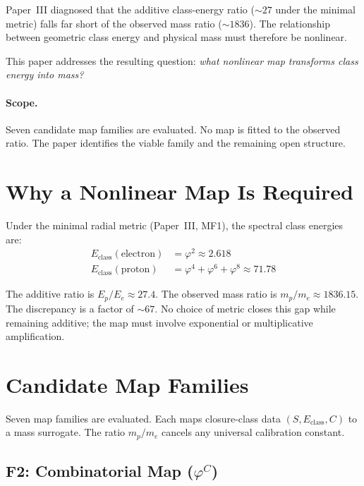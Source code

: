 \documentclass[12pt]{article}
\newcommand{\phig}{\varphi}
\begin{document}
Paper~III diagnosed that the additive class-energy ratio ($\sim\!27$ under the minimal metric) falls far short of the observed mass ratio ($\sim\!1836$). The relationship between geometric class energy and physical mass must therefore be nonlinear.

This paper addresses the resulting question: \textit{what nonlinear map transforms class energy into mass?}

\paragraph{Scope.} Seven candidate map families are evaluated. No map is fitted to the observed ratio. The paper identifies the viable family and the remaining open structure.

\section{Why a Nonlinear Map Is Required}\label{sec:why}

Under the minimal radial metric (Paper~III, MF1), the spectral class energies are:
\begin{align}
    E_{\mathrm{class}}(\text{electron}) &= \phig^2 \approx 2.618 \\
    E_{\mathrm{class}}(\text{proton}) &= \phig^4 + \phig^6 + \phig^8 \approx 71.78
\end{align}

The additive ratio is $E_p / E_e \approx 27.4$. The observed mass ratio is $m_p / m_e \approx 1836.15$. The discrepancy is a factor of $\sim\!67$. No choice of metric closes this gap while remaining additive; the map must involve exponential or multiplicative amplification.

\section{Candidate Map Families}\label{sec:maps}

Seven map families are evaluated. Each maps closure-class data $(S, E_{\mathrm{class}}, C)$ to a mass surrogate. The ratio $m_p/m_e$ cancels any universal calibration constant.

\subsection{F2: Combinatorial Map ($\phig^C$)}
\end{document}
